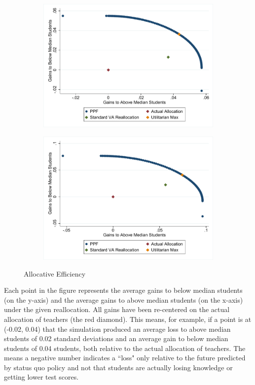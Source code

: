 \documentclass[12pt]{article}
\theoremstyle{definition}
\theoremstyle{definition}
\theoremstyle{definition}
\theoremstyle{definition}
\begin{document}
\begin{figure}[H]
    \begin{subfigure}[b]{0.45\textwidth}
        \includegraphics[width=1\textwidth]{Working_Paper/WP_Figures/AcrossSchoolReallocationELA.pdf}
    \end{subfigure}
    \begin{subfigure}[b]{0.45\textwidth}
        \includegraphics[width=1\textwidth]{Working_Paper/WP_Figures/AcrossSchoolReallocationMath.pdf}
    \end{subfigure}
    \caption{Allocative Efficiency}
    \label{fig:aloc_eff}
\end{figure}

	Each point in the figure represents the average gains to below median students (on the y-axis) and the average gains to above median students (on the x-axis) under the given reallocation. All gains have been re-centered on the actual allocation of teachers (the red diamond). This means, for example, if a point is at (-0.02, 0.04) that the simulation produced an average loss to above median students of 0.02 standard deviations and an average gain to below median students of 0.04 students, both relative to the actual allocation of teachers. The means a negative number indicates a ``loss" only relative to the future predicted by status quo policy and not that students are actually losing knowledge or getting lower test scores. 
\end{document}
